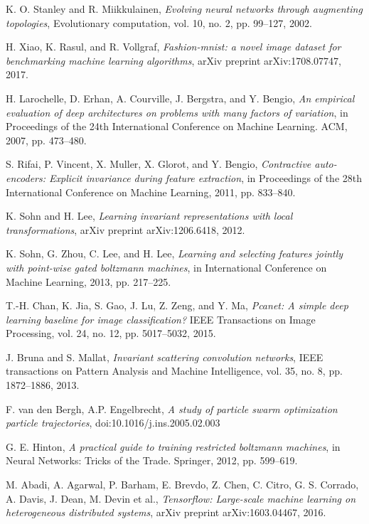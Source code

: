 \documentclass[conference]{IEEEtran}
\begin{document}
\begin{thebibliography}{}
K. O. Stanley and R. Miikkulainen, \emph{Evolving neural networks through augmenting topologies}, Evolutionary computation, vol. 10, no. 2, pp. 99–127, 2002.

H. Xiao, K. Rasul, and R. Vollgraf, \emph{Fashion-mnist: a novel image dataset for benchmarking machine learning algorithms}, arXiv preprint arXiv:1708.07747, 2017.

H. Larochelle, D. Erhan, A. Courville, J. Bergstra, and Y. Bengio, \emph{An empirical evaluation of deep architectures on problems with many factors of variation}, in Proceedings of the 24th International Conference on Machine Learning. ACM, 2007, pp. 473–480.

S. Rifai, P. Vincent, X. Muller, X. Glorot, and Y. Bengio, \emph{Contractive auto-encoders: Explicit invariance during feature extraction}, in Proceedings of the 28th International Conference on Machine Learning, 2011, pp. 833–840. 

K. Sohn and H. Lee, \emph{Learning invariant representations with local transformations}, arXiv preprint arXiv:1206.6418, 2012. 

K. Sohn, G. Zhou, C. Lee, and H. Lee, \emph{Learning and selecting features jointly with point-wise gated boltzmann machines}, in International Conference on Machine Learning, 2013, pp. 217–225. 

T.-H. Chan, K. Jia, S. Gao, J. Lu, Z. Zeng, and Y. Ma, \emph{Pcanet: A simple deep learning baseline for image classiﬁcation?} IEEE Transactions on Image Processing, vol. 24, no. 12, pp. 5017–5032, 2015. 

J. Bruna and S. Mallat, \emph{Invariant scattering convolution networks}, IEEE transactions on Pattern Analysis and Machine Intelligence, vol. 35, no. 8, pp. 1872–1886, 2013. 

F. van den Bergh, A.P. Engelbrecht, \emph{A study of particle swarm optimization particle trajectories}, doi:10.1016/j.ins.2005.02.003

G. E. Hinton, \emph{A practical guide to training restricted boltzmann machines}, in Neural Networks: Tricks of the Trade. Springer, 2012, pp. 599–619.

M. Abadi, A. Agarwal, P. Barham, E. Brevdo, Z. Chen, C. Citro, G. S. Corrado, A. Davis, J. Dean, M. Devin et al., \emph{Tensorﬂow: Large-scale machine learning on heterogeneous distributed systems}, arXiv preprint arXiv:1603.04467, 2016. 


\end{thebibliography}
\end{document}
